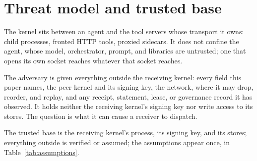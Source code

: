 \section{Threat model and trusted base}
\label{sec:threat}

The kernel sits between an agent and the tool servers whose transport it owns:
child processes, fronted HTTP tools, proxied sidecars. It does not confine the
agent, whose model, orchestrator, prompt, and libraries are untrusted; one that
opens its own socket reaches whatever that socket reaches.

The adversary is given everything outside the receiving kernel: every field
this paper names, the peer kernel and its signing key, the network, where
it may drop, reorder, and replay, and any receipt, statement, lease, or
governance record it has observed. It holds neither the receiving kernel's
signing key nor write access to its stores. The question is what it can cause a
receiver to dispatch.

The trusted base is the receiving kernel's process, its signing key, and its
stores; everything outside is verified or assumed; the assumptions appear once,
in Table~\ref{tab:assumptions}.

